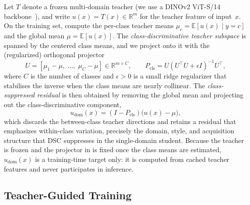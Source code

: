 Let $T$ denote a frozen multi-domain teacher (we use a DINOv2 ViT-S/14 backbone~\citep{oquab2023dinov2}), and write $u(x) = T(x) \in \mathbb{R}^m$ for the teacher feature of input~$x$. On the training set, compute the per-class teacher means $\mu_c = \mathbb{E}[u(x) \mid y{=}c]$ and the global mean $\mu = \mathbb{E}[u(x)]$. The \emph{class-discriminative teacher subspace} is spanned by the centered class means, and we project onto it with the (regularized) orthogonal projector
\begin{equation}
  U = [\mu_1{-}\mu,\;\ldots,\;\mu_C{-}\mu] \in \mathbb{R}^{m \times C}, \qquad
  P_{\mathrm{cls}} = U(U^\top U + \epsilon I)^{-1}U^\top,
  \label{eq:dsc:pcls}
\end{equation}
where $C$ is the number of classes and $\epsilon > 0$ is a small ridge regularizer that stabilises the inverse when the class means are nearly collinear. The \emph{class-suppressed residual} is then obtained by removing the global mean and projecting out the class-discriminative component,
\begin{equation}
  u_{\mathrm{dom}}(x) = (I - P_{\mathrm{cls}})\bigl(u(x) - \mu\bigr),
  \label{eq:dsc:udom}
\end{equation}
which discards the between-class teacher directions and retains a residual that emphasizes within-class variation, precisely the domain, style, and acquisition structure that DSC suppresses in the single-domain student. Because the teacher is frozen and the projector in  is fixed once the class means are estimated, $u_{\mathrm{dom}}(x)$ is a training-time target only: it is computed from cached teacher features and never participates in inference.

\subsection{Teacher-Guided Training}
\label{sec:dsc:method:tgt}

